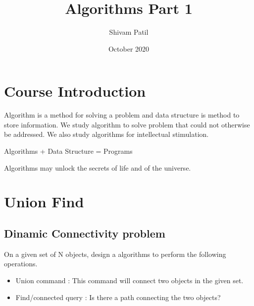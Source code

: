 \documentclass{article}
\title{Algorithms Part 1}
\author{Shivam Patil }
\date{October 2020}
\begin{document}
\maketitle

\section{Course Introduction}
Algorithm is a method for solving a problem and data structure is method to store information.
 We study algorithm to solve problem that could not otherwise be addressed. We also study 
 algorithms for intellectual stimulation.
 
 \begin{center}
     Algorithms + Data Structure = Programs
 \end{center}
 Algorithms may unlock the secrets of life and of the universe.


\section{Union Find}
\subsection{Dinamic Connectivity problem}
On a given set of N objects, design a algorithms to perform the following operations.
\begin{itemize}
    \item Union command : This command will connect two objects in the given set.
    \item Find/connected query : Is there a path connecting the two objects?
\end{itemize}





\end{document}
